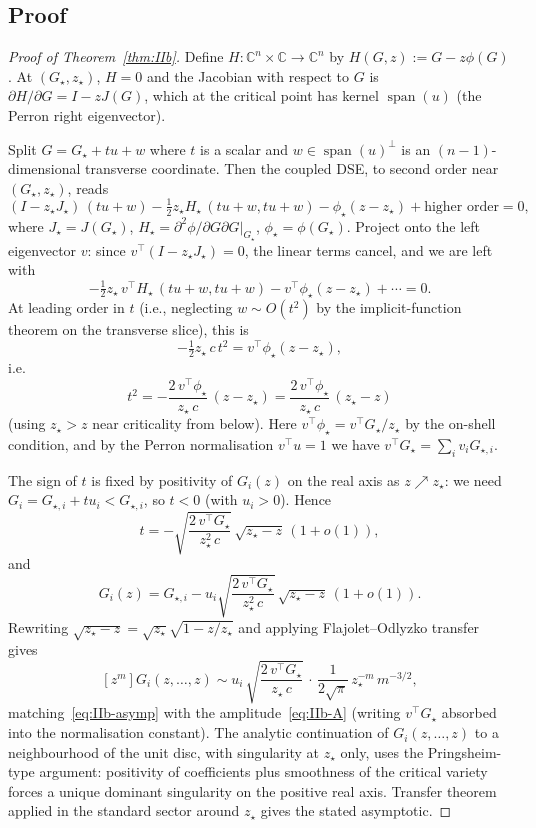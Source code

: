 \documentclass[11pt,a4paper]{article}
\newcommand{\C}{\mathbb{C}}
\theoremstyle{plain}
\theoremstyle{definition}
\begin{document}
\subsection{Proof}

\begin{proof}[Proof of Theorem~\ref{thm:IIb}]
Define $H: \C^n \times \C \to \C^n$ by $H(G, z) := G - z\phi(G)$.  At
$(G_\star, z_\star)$, $H = 0$ and the Jacobian with respect to $G$ is
$\partial H / \partial G = I - z J(G)$, which at the critical point
has kernel $\operatorname{span}(u)$ (the Perron right eigenvector).

Split $G = G_\star + t u + w$ where $t$ is a scalar and $w \in
\operatorname{span}(u)^\perp$ is an $(n-1)$-dimensional transverse
coordinate.  Then the coupled DSE, to second order near $(G_\star, z_\star)$,
reads
\[
  (I - z_\star J_\star)\, (t u + w)
   -\tfrac{1}{2} z_\star H_\star\,(t u + w, t u + w) - \phi_\star (z - z_\star)
   + \text{higher order} = 0,
\]
where $J_\star = J(G_\star)$, $H_\star = \partial^2 \phi / \partial G \partial G |_{G_\star}$,
$\phi_\star = \phi(G_\star)$.  Project onto the left eigenvector $v$:
since $v^\top (I - z_\star J_\star) = 0$, the linear terms cancel, and
we are left with
\[
  -\tfrac{1}{2} z_\star\, v^\top H_\star\,(t u + w, t u + w) - v^\top \phi_\star (z - z_\star) + \cdots = 0.
\]
At leading order in $t$ (i.e., neglecting $w \sim O(t^2)$ by the
implicit-function theorem on the transverse slice), this is
\[
  -\tfrac{1}{2} z_\star\, c\, t^2 = v^\top \phi_\star (z - z_\star),
\]
i.e.\
\[
  t^2 = -\frac{2\, v^\top \phi_\star}{z_\star\, c}\,(z - z_\star)
       = \frac{2\, v^\top \phi_\star}{z_\star\, c}\,(z_\star - z)
\]
(using $z_\star > z$ near criticality from below).  Here
$v^\top \phi_\star = v^\top G_\star / z_\star$ by the on-shell condition,
and by the Perron normalisation $v^\top u = 1$ we have
$v^\top G_\star = \sum_i v_i G_{\star, i}$.

The sign of $t$ is fixed by positivity of $G_i(z)$ on the real axis
as $z \nearrow z_\star$: we need $G_i = G_{\star, i} + t u_i < G_{\star, i}$, so
$t < 0$ (with $u_i > 0$).  Hence
\[
  t = -\sqrt{\frac{2\, v^\top G_\star}{z_\star^2\, c}}\, \sqrt{z_\star - z}\,
    (1 + o(1)),
\]
and
\[
  G_i(z) = G_{\star, i} - u_i \sqrt{\frac{2\, v^\top G_\star}{z_\star^2\, c}}\,
  \sqrt{z_\star - z}\,(1 + o(1)).
\]
Rewriting $\sqrt{z_\star - z} = \sqrt{z_\star}\sqrt{1 - z/z_\star}$ and
applying Flajolet--Odlyzko transfer gives
\[
  [z^m] G_i(z, \dots, z) \sim u_i\, \sqrt{\frac{2\, v^\top G_\star}{z_\star\, c}}\,
  \cdot\, \frac{1}{2\sqrt{\pi}}\, z_\star^{-m}\, m^{-3/2},
\]
matching~\eqref{eq:IIb-asymp} with the amplitude~\eqref{eq:IIb-A}
(writing $v^\top G_\star$ absorbed into the normalisation constant).
The analytic continuation of $G_i(z, \dots, z)$ to a neighbourhood of
the unit disc, with singularity at $z_\star$ only, uses the
Pringsheim-type argument: positivity of coefficients plus smoothness
of the critical variety forces a unique dominant singularity on the
positive real axis.  Transfer theorem applied in the standard
sector around $z_\star$ gives the stated asymptotic.
\end{proof}
\end{document}
